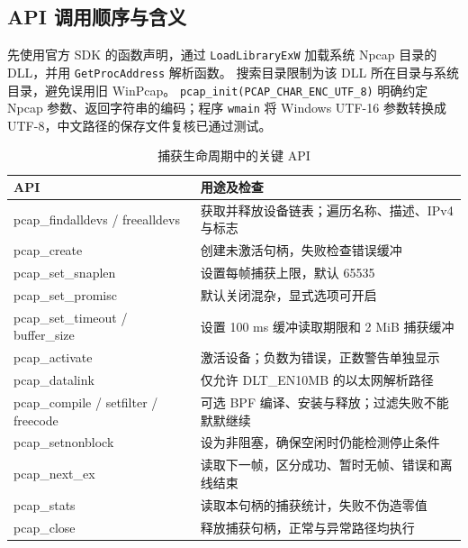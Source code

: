 \documentclass[UTF8,notitlepage,11pt]{ctexart}
\newcommand{\src}[1]{\nolinkurl{#1}}
\begin{document}
\subsection{API 调用顺序与含义}
先使用官方 SDK 的函数声明，通过 \src{LoadLibraryExW} 加载系统 Npcap 目录的 DLL，并用 \src{GetProcAddress} 解析函数。
搜索目录限制为该 DLL 所在目录与系统目录，避免误用旧 WinPcap。
\src{pcap_init(PCAP_CHAR_ENC_UTF_8)} 明确约定 Npcap 参数、返回字符串的编码；程序 \src{wmain} 将 Windows UTF-16 参数转换成 UTF-8，中文路径的保存文件复核已通过测试\cite{pcapinit}。

\begin{table}[H]\centering\small
\caption{捕获生命周期中的关键 API}
\begin{tabularx}{\textwidth}{p{}X}\toprule
API & 用途及检查\\\midrule
pcap\_findalldevs / freealldevs & 获取并释放设备链表；遍历名称、描述、IPv4 与标志\\
pcap\_create & 创建未激活句柄，失败检查错误缓冲\\
pcap\_set\_snaplen & 设置每帧捕获上限，默认 65535\\
pcap\_set\_promisc & 默认关闭混杂，显式选项可开启\\
pcap\_set\_timeout / buffer\_size & 设置 100 ms 缓冲读取期限和 2 MiB 捕获缓冲\\
pcap\_activate & 激活设备；负数为错误，正数警告单独显示\\
pcap\_datalink & 仅允许 DLT\_EN10MB 的以太网解析路径\\
pcap\_compile / setfilter / freecode & 可选 BPF 编译、安装与释放；过滤失败不能默默继续\\
pcap\_setnonblock & 设为非阻塞，确保空闲时仍能检测停止条件\\
pcap\_next\_ex & 读取下一帧，区分成功、暂时无帧、错误和离线结束\\
pcap\_stats & 读取本句柄的捕获统计，失败不伪造零值\\
pcap\_close & 释放捕获句柄，正常与异常路径均执行\\\bottomrule
\end{tabularx}\end{table}
\end{document}
